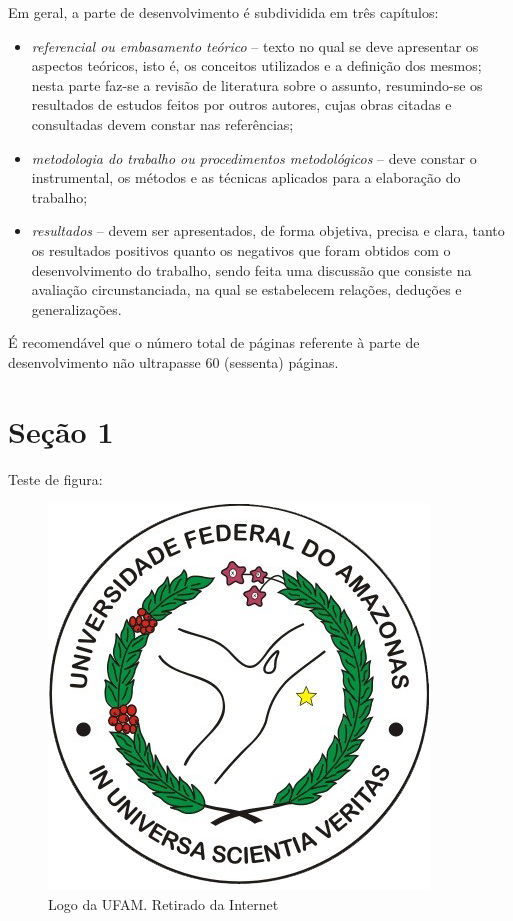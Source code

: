 \documentclass[
	12pt,			%
	openright,		%
	oneside,	
	a4paper,		%
	english,		%
	brazil			%
]{abntex2/abntex2}  %
\begin{document}
	Em geral, a parte de desenvolvimento é subdividida em três capítulos:

	\begin{itemize}
		\item \textit{referencial ou embasamento teórico} – texto no qual se deve apresentar os aspectos teóricos, isto é, os conceitos utilizados e a definição dos mesmos; nesta parte faz-se a revisão de literatura sobre o assunto, resumindo-se os resultados de estudos feitos por outros autores, cujas obras citadas e consultadas devem constar nas referências;
	
		\item \textit{metodologia do trabalho ou procedimentos metodológicos} – deve constar o instrumental, os métodos e as técnicas aplicados para a elaboração do trabalho;
	
		\item \textit{resultados} – devem ser apresentados, de forma objetiva, precisa e clara, tanto os resultados positivos quanto os negativos que foram obtidos com o desenvolvimento do trabalho, sendo feita uma discussão que consiste na avaliação circunstanciada, na qual se estabelecem relações, deduções e generalizações.
	\end{itemize}

	É recomendável que o número total de páginas referente à parte de desenvolvimento não ultrapasse 60 (sessenta) páginas.

	\section{Seção 1}

		Teste de figura:

		\begin{figure}[h!]
			\begin{center}
			    \includegraphics[scale=0.5]{abntex2/ufam-logo}
			\end{center}
			\caption{\label{fig_grafico}Logo da UFAM. Retirado da Internet}
		\end{figure}
		
\end{document}
